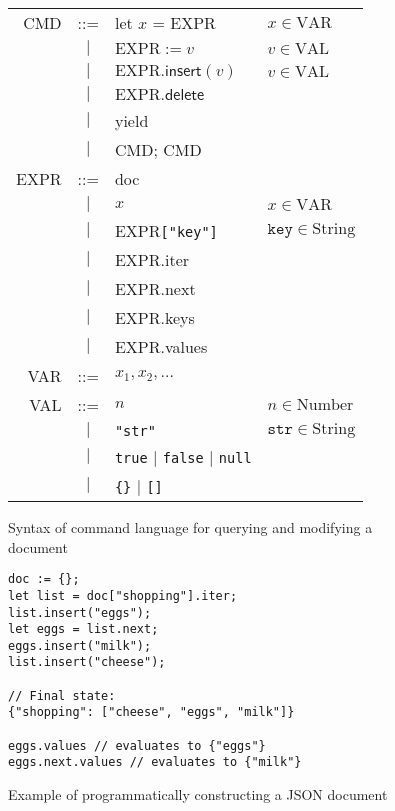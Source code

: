 \documentclass[10pt,journal,compsoc]{IEEEtran}
\begin{document}
\begin{figure}
\centering
\begin{tabular}{rcll}
CMD & ::= & \textsf{let} $x$ = EXPR & $x \in \mathrm{VAR}$ \\
& $|$ & $\mathrm{EXPR} := v$ & $v \in \mathrm{VAL}$ \\
& $|$ & $\mathrm{EXPR}.\mathsf{insert}(v)$ & $v \in \mathrm{VAL}$ \\
& $|$ & $\mathrm{EXPR}.\mathsf{delete}$ \\
& $|$ & \textsf{yield} \\
& $|$ & CMD; CMD \vspace{0.5em}\\
EXPR & ::= & \textsf{doc} \\
& $|$ & $x$ & $x \in \mathrm{VAR}$ \\
& $|$ & EXPR\verb|["key"]| & $\mathtt{key} \in \mathrm{String}$ \\
& $|$ & EXPR.\textsf{iter} \\
& $|$ & EXPR.\textsf{next} \\
& $|$ & EXPR.\textsf{keys} \\
& $|$ & EXPR.\textsf{values} \vspace{0.5em}\\
VAR & ::= & ${x_1, x_2, \dots}$ \vspace{0.5em}\\
VAL & ::= & $n$ & $n \in \mathrm{Number}$ \\
& $|$ & \verb|"str"| & $\mathtt{str} \in \mathrm{String}$ \\
& $|$ & \verb|true| $|$ \verb|false| $|$ \verb|null| \\
& $|$ & \verb|{}| $|$ \verb|[]|
\end{tabular}
\caption{Syntax of command language for querying and modifying a document}\label{fig:local-syntax}
\end{figure}

\begin{figure}
\centering
\begin{verbatim}
doc := {};
let list = doc["shopping"].iter;
list.insert("eggs");
let eggs = list.next;
eggs.insert("milk");
list.insert("cheese");

// Final state:
{"shopping": ["cheese", "eggs", "milk"]}

eggs.values // evaluates to {"eggs"}
eggs.next.values // evaluates to {"milk"}
\end{verbatim}
\caption{Example of programmatically constructing a JSON document}\label{fig:make-doc}
\end{figure}
\end{document}
